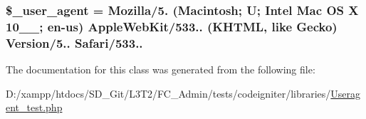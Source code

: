 \subsubsection[{\$\+\_\+user\+\_\+agent}]{\setlength{\rightskip}{0pt plus 5cm}\$\+\_\+user\+\_\+agent = \textquotesingle{}Mozilla/5. (Macintosh; U; Intel Mac O\+S X 10\+\_\+\_; en-\/us) Apple\+Web\+Kit/533.. (\+K\+H\+T\+M\+L, like Gecko) Version/5.. Safari/533..\textquotesingle{}\hspace{0.3cm}{\ttfamily [protected]}}\label{class_user_agent__test_a065c2fd6c1e981742fb5f63b750c773f}


The documentation for this class was generated from the following file\+:\begin{DoxyCompactItemize}
\item 
D\+:/xampp/htdocs/\+S\+D\+\_\+\+Git/\+L3\+T2/\+F\+C\+\_\+\+Admin/tests/codeigniter/libraries/\hyperlink{_useragent__test_8php}{Useragent\+\_\+test.\+php}\end{DoxyCompactItemize}
